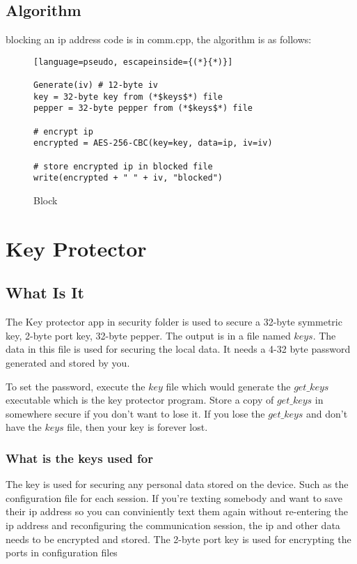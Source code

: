 \documentclass[a4paper,12pt]{article}
\begin{document}
\subsection{Algorithm}

blocking an ip address code is in comm.cpp, the algorithm is as follows:

\begin{figure}[htb]
\begin{small}
\begin{lstlisting}[language=pseudo, escapeinside={(*}{*)}]

Generate(iv) # 12-byte iv
key = 32-byte key from (*$keys$*) file
pepper = 32-byte pepper from (*$keys$*) file

# encrypt ip
encrypted = AES-256-CBC(key=key, data=ip, iv=iv)

# store encrypted ip in blocked file
write(encrypted + " " + iv, "blocked")

\end{lstlisting}
\end{small}
\caption{Block}\label{blocking}
\end{figure}

\section{Key Protector}


\subsection{What Is It}

The Key protector app in security folder is used to secure a 32-byte symmetric key, 2-byte port key, 32-byte pepper. The output is in a file named $keys$. The data in this file is used for securing the local data. It needs a 4-32 byte password generated and stored by you. 

To set the password, execute the $key$ file which would generate the $get\_keys$ executable which is the key protector program. Store a copy of $get\_keys$ in somewhere secure if you don't want to lose it. If you lose the $get\_keys$ and don't have the $keys$ file, then your key is forever lost.

\subsubsection{What is the keys used for}

The key is used for securing any personal data stored on the device. Such as the configuration file for each session. If you're texting somebody and want to save their ip address so you can conviniently text them again without re-entering the ip address and reconfiguring the communication session, the ip and other data needs to be encrypted and stored.
The 2-byte port key is used for encrypting the ports in configuration files
\end{document}

